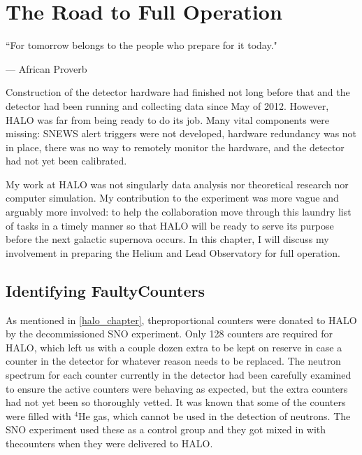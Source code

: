 %
%
%
%


\chapter{The Road to Full Operation}
	\label{halo2_chapter}

	\begin{quoting}
		\noindent \large ``For tomorrow belongs to the people who prepare for it today." \normalsize

		--- African Proverb
	\end{quoting}

	 Construction of the detector hardware had finished not long before that and the detector had been running and collecting data since May of 2012. However, HALO was far from being ready to do its job. Many vital components were missing: SNEWS alert triggers were not developed, hardware redundancy was not in place, there was no way to remotely monitor the hardware, and the detector had not yet been calibrated. 

	My work at HALO was not singularly data analysis nor theoretical research nor computer simulation. My contribution to the experiment was more vague and arguably more involved: to help the collaboration move through this laundry list of tasks in a timely manner so that HALO will be ready to serve its purpose before the next galactic supernova occurs. In this chapter, I will discuss my involvement in preparing the Helium and Lead Observatory for full operation.

	\section{Identifying Faulty{}\he Counters}
		As mentioned in \CHP \ref{halo_chapter}, the{}\he proportional counters were donated to HALO by the decommissioned SNO experiment. Only 128 counters are required for HALO, which left us with a couple dozen extra to be kept on reserve in case a counter in the detector for whatever reason needs to be replaced. The neutron spectrum for each counter currently in the detector had been carefully examined to ensure the active counters were behaving as expected, but the extra counters had not yet been so thoroughly vetted. It was known that some of the counters were filled with $^4$He gas, which cannot be used in the detection of neutrons. The SNO experiment used these as a control group and they got mixed in with the{}\he counters when they were delivered to HALO. 

